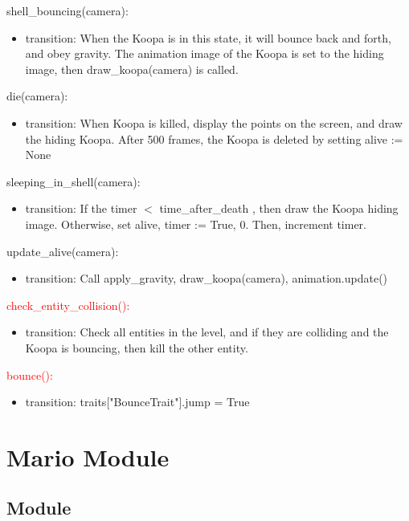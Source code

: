 \documentclass[12pt]{article}
\begin{document}
shell\_bouncing(camera):
\begin{itemize}
    \item transition: When the Koopa is in this state, it will bounce back and forth, and obey gravity. The animation image of the Koopa is set to the hiding image, then draw\_koopa(camera) is called.
\end{itemize}

die(camera):
\begin{itemize}
    \item transition: When Koopa is killed, display the points on the screen, and draw the hiding Koopa. After 500 frames, the Koopa is deleted by setting alive := None
\end{itemize}

sleeping\_in\_shell(camera):
\begin{itemize}
    \item transition: If the timer $<$ time\_after\_death , then draw the Koopa hiding image. Otherwise, set alive, timer := True, 0. Then, increment timer.
\end{itemize}

update\_alive(camera):
\begin{itemize}
    \item transition: Call apply\_gravity, draw\_koopa(camera), animation.update()
\end{itemize}

\textcolor{red}{check\_entity\_collision():}
\begin{itemize}
    \item \color{red}transition: Check all entities in the level, and if they are colliding and the Koopa is bouncing, then kill the other entity.
\end{itemize}

\textcolor{red}{bounce():}
\begin{itemize}
    \item \color{red}transition: traits["BounceTrait"].jump = True
\end{itemize}

\newpage

\section*{Mario Module}
\subsection*{Module}
\end{document}
